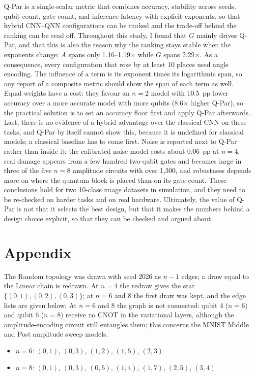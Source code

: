\documentclass{ieeeaccess}
\begin{document}
Q-Par is a single-scalar metric that combines accuracy, stability across seeds, qubit count, gate count, and inference latency with explicit exponents, so that hybrid CNN--QNN configurations can be ranked and the trade-off behind the ranking can be read off. Throughout this study, I found that $G$ mainly drives Q-Par, and that this is also the reason why the ranking stays stable when the exponents change: $A$ spans only 1.16--1.19$\times$ while $G$ spans 2.29$\times$. As a consequence, every configuration that rose by at least 10 places used angle encoding. The influence of a term is its exponent times its logarithmic span, so any report of a composite metric should show the span of each term as well. Equal weights have a cost: they favour an $n = 2$ model with 10.5~pp lower accuracy over a more accurate model with more qubits (8.6$\times$ higher Q-Par), so the practical solution is to set an accuracy floor first and apply Q-Par afterwards. Last, there is no evidence of a hybrid advantage over the classical CNN on these tasks, and Q-Par by itself cannot show this, because it is undefined for classical models; a classical baseline has to come first. Noise is reported next to Q-Par rather than inside it: the calibrated noise model costs about 0.06~pp at $n = 4$, real damage appears from a few hundred two-qubit gates and becomes large in three of the five $n = 8$ amplitude circuits with over 1,300, and robustness depends more on where the quantum block is placed than on its gate count. These conclusions hold for two 10-class image datasets in simulation, and they need to be re-checked on harder tasks and on real hardware. Ultimately, the value of Q-Par is not that it selects the best design, but that it makes the numbers behind a design choice explicit, so that they can be checked and argued about.

\appendix
{}
\section*{Appendix}

The Random topology was drawn with seed 2026 as $n-1$ edges; a draw equal to the Linear chain is redrawn. At $n = 4$ the redraw gives the star $\{(0,1), (0,2), (0,3)\}$; at $n = 6$ and 8 the first draw was kept, and the edge lists are given below. At $n = 6$ and 8 the graph is not connected: qubit 4 ($n = 6$) and qubit 6 ($n = 8$) receive no CNOT in the variational layers, although the amplitude-encoding circuit still entangles them; this concerns the MNIST Middle and Post amplitude sweep models.
\begin{itemize}
\item $n = 6$: $(0,1)$, $(0,3)$, $(1,2)$, $(1,5)$, $(2,3)$
\item $n = 8$: $(0,1)$, $(0,3)$, $(0,5)$, $(1,4)$, $(1,7)$, $(2,5)$, $(3,4)$
\end{itemize}
\end{document}
